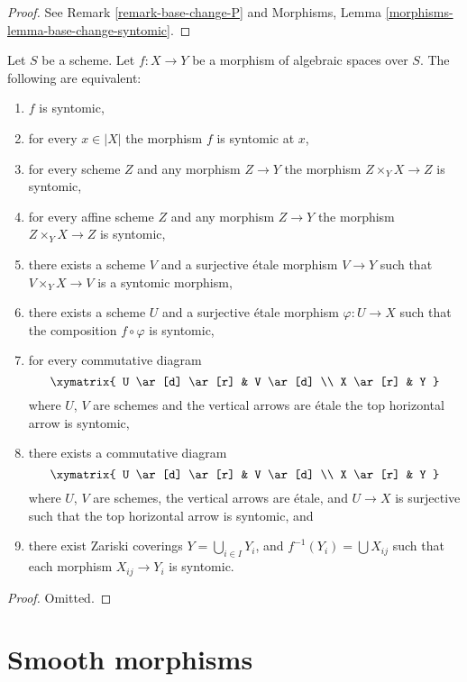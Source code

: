 \begin{proof}
See Remark \ref{remark-base-change-P} and
Morphisms, Lemma \ref{morphisms-lemma-base-change-syntomic}.
\end{proof}

\begin{lemma}
\label{lemma-syntomic-local}
Let $S$ be a scheme.
Let $f : X \to Y$ be a morphism of algebraic spaces over $S$.
The following are equivalent:
\begin{enumerate}
\item $f$ is syntomic,
\item for every $x \in |X|$ the morphism $f$ is syntomic at $x$,
\item for every scheme $Z$ and any morphism $Z \to Y$ the morphism
$Z \times_Y X \to Z$ is syntomic,
\item for every affine scheme $Z$ and any morphism
$Z \to Y$ the morphism $Z \times_Y X \to Z$ is syntomic,
\item there exists a scheme $V$ and a surjective \'etale morphism
$V \to Y$ such that $V \times_Y X \to V$ is a syntomic morphism,
\item there exists a scheme $U$ and a surjective \'etale morphism
$\varphi : U \to X$ such that the composition $f \circ \varphi$
is syntomic,
\item for every commutative diagram
$$
\xymatrix{
U \ar[d] \ar[r] & V \ar[d] \\
X \ar[r] & Y
}
$$
where $U$, $V$ are schemes and the vertical arrows are \'etale
the top horizontal arrow is syntomic,
\item there exists a commutative diagram
$$
\xymatrix{
U \ar[d] \ar[r] & V \ar[d] \\
X \ar[r] & Y
}
$$
where $U$, $V$ are schemes, the vertical arrows are \'etale, and
$U \to X$ is surjective such that the top horizontal arrow is syntomic, and
\item there exist Zariski coverings $Y = \bigcup_{i \in I} Y_i$,
and $f^{-1}(Y_i) = \bigcup X_{ij}$ such that
each morphism $X_{ij} \to Y_i$ is syntomic.
\end{enumerate}
\end{lemma}

\begin{proof}
Omitted.
\end{proof}






\section{Smooth morphisms}
\label{section-smooth}

